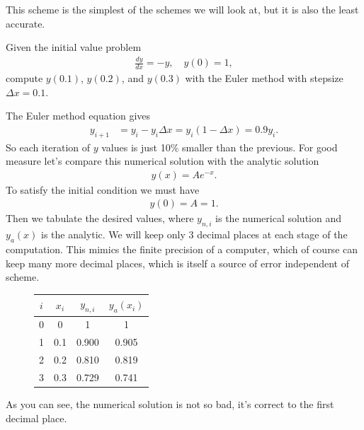 \noindent {}

This scheme is the simplest of the schemes we will look at, but it is also the least accurate.

\exemple{\upline}
{
Given the initial value problem
\begin{align*}
\frac{dy}{dx} = -y, \quad y(0)=1,
\end{align*}
compute $y(0.1)$, $y(0.2)$, and $y(0.3)$ with the Euler method with stepsize $\Delta x = 0.1$.

\noindent The Euler method equation gives
\begin{align*}
y_{i+1} &= y_i -y_i \Delta x = y_i ( 1 - \Delta x ) = 0.9 y_i.
\end{align*}
So each iteration of $y$ values is just 10\% smaller than the previous. For good measure let's compare this numerical solution with the analytic solution
\begin{align*}
y(x) = A e^{-x}.
\end{align*}
To satisfy the initial condition we must have
\begin{align*}
y(0) = A = 1.
\end{align*}
Then we tabulate the desired values, where $y_{n,i}$ is the numerical solution and $y_a(x)$ is the analytic. We will keep only 3 decimal places at each stage of the computation. This mimics the finite precision of a computer, which of course can keep many more decimal places, which is itself a source of error independent of scheme.
\begin{figure}[H]
\centering
\begin{tabular}{cccc}
$i$ & $x_i$ & $y_{n,i}$ & $y_{a}(x_i)$ \\ \hline
0 & 0   & 1     & 1 \\
1 & 0.1 & 0.900 & 0.905 \\
2 & 0.2 & 0.810 & 0.819 \\
3 & 0.3 & 0.729 & 0.741
\end{tabular}
\end{figure}

\noindent As you can see, the numerical solution is not so bad, it's correct to the first decimal place.
}{\downline}\label{ex:diff_euler}



